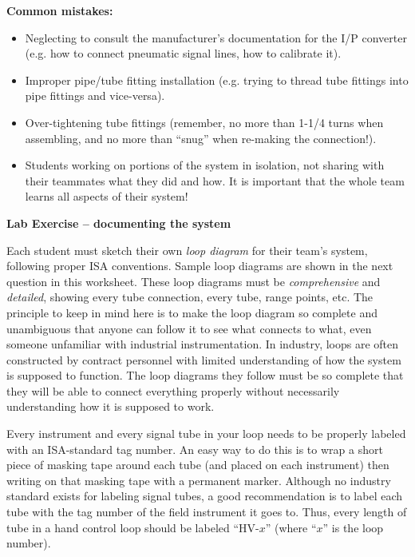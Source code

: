 \documentclass[12pt,a4paper]{article}
\begin{document}
\begin{itemize}
\vskip 10pt

{\bf Common mistakes:}

\begin{itemize}
\item{} Neglecting to consult the manufacturer's documentation for the I/P converter (e.g. how to connect pneumatic signal lines, how to calibrate it).
\item{} Improper pipe/tube fitting installation (e.g. trying to thread tube fittings into pipe fittings and vice-versa).
\item{} Over-tightening tube fittings (remember, no more than 1-1/4 turns when assembling, and no more than ``snug'' when re-making the connection!).
\item{} Students working on portions of the system in isolation, not sharing with their teammates what they did and how.  It is important that the whole team learns all aspects of their system!
\end{itemize}


\vfil \eject

\noindent
{\bf Lab Exercise -- documenting the system}

\vskip 5pt

Each student must sketch their own {\it loop diagram} for their team's system, following proper ISA conventions.  Sample loop diagrams are shown in the next question in this worksheet.  These loop diagrams must be {\it comprehensive} and {\it detailed}, showing every tube connection, every tube, range points, etc.  The principle to keep in mind here is to make the loop diagram so complete and unambiguous that anyone can follow it to see what connects to what, even someone unfamiliar with industrial instrumentation.  In industry, loops are often constructed by contract personnel with limited understanding of how the system is supposed to function.  The loop diagrams they follow must be so complete that they will be able to connect everything properly without necessarily understanding how it is supposed to work.

Every instrument and every signal tube in your loop needs to be properly labeled with an ISA-standard tag number.  An easy way to do this is to wrap a short piece of masking tape around each tube (and placed on each instrument) then writing on that masking tape with a permanent marker.  Although no industry standard exists for labeling signal tubes, a good recommendation is to label each tube with the tag number of the field instrument it goes to.  Thus, every length of tube in a hand control loop should be labeled ``HV-$x$'' (where ``$x$'' is the loop number).


\end{itemize}
\end{document}
